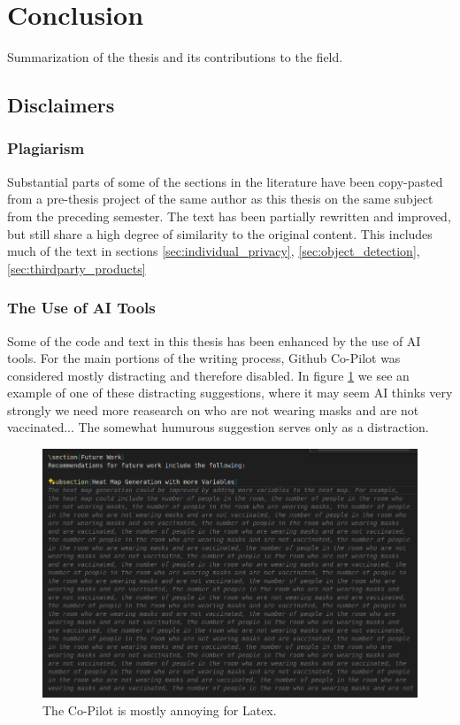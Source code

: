 \section{Conclusion}
\label{sec:conclusions}
Summarization of the thesis and its contributions to the field.


\subsection{Disclaimers}
\label{sec:disclaimers}

\subsubsection{Plagiarism}
Substantial parts of some of the sections in the literature have been copy-pasted from a pre-thesis project of the same author as this thesis on the same subject from the preceding semester. The text has been partially rewritten and improved, but still share a high degree of similarity to the original content. This includes much of the text in sections \ref{sec:individual_privacy}, \ref{sec:object_detection}, \ref{sec:thirdparty_products}

\subsubsection{The Use of AI Tools}
Some of the code and text in this thesis has been enhanced by the use of AI tools. For the main portions of the writing process, Github Co-Pilot was considered mostly distracting and therefore disabled. In figure \ref{fig:co-pilot_distracting} we see an example of one of these distracting suggestions, where it may seem AI thinks very strongly we need more reasearch on who are not wearing masks and are not vaccinated... The somewhat humurous suggestion serves only as a distraction. 

\begin{figure}[H]
	\centering
	\includegraphics[width=\textwidth]{Images/Fun/co_pilot_distracting.png}
	\caption{The Co-Pilot is mostly annoying for Latex.}
	\label{fig:co-pilot_distracting}
\end{figure}

